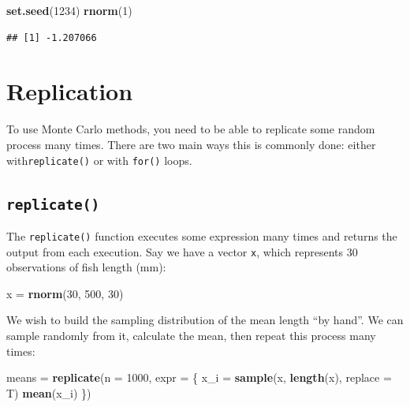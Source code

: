 \documentclass[]{book}
\newenvironment{Shaded}{\begin{snugshade}}{\end{snugshade}}
\newcommand{\KeywordTok}[1]{\textcolor[rgb]{0.13,0.29,0.53}{\textbf{#1}}}
\newcommand{\DataTypeTok}[1]{\textcolor[rgb]{0.13,0.29,0.53}{#1}}
\newcommand{\DecValTok}[1]{\textcolor[rgb]{0.00,0.00,0.81}{#1}}
\newcommand{\StringTok}[1]{\textcolor[rgb]{0.31,0.60,0.02}{#1}}
\newcommand{\NormalTok}[1]{#1}
\theoremstyle{definition}
\theoremstyle{definition}
\theoremstyle{definition}
\theoremstyle{remark}
\begin{document}
\begin{Shaded}
\begin{Highlighting}[]
\KeywordTok{set.seed}\NormalTok{(}\DecValTok{1234}\NormalTok{)}
\KeywordTok{rnorm}\NormalTok{(}\DecValTok{1}\NormalTok{)}
\end{Highlighting}
\end{Shaded}

\begin{verbatim}
## [1] -1.207066
\end{verbatim}

\section{Replication}\label{replication}

To use Monte Carlo methods, you need to be able to replicate some random
process many times. There are two main ways this is commonly done:
either with\texttt{replicate()} or with \texttt{for()} loops.

\subsection{\texorpdfstring{\texttt{replicate()}}{replicate()}}\label{replicate}

The \texttt{replicate()} function executes some expression many times
and returns the output from each execution. Say we have a vector
\texttt{x}, which represents 30 observations of fish length (mm):

\begin{Shaded}
\begin{Highlighting}[]
\NormalTok{x =}\StringTok{ }\KeywordTok{rnorm}\NormalTok{(}\DecValTok{30}\NormalTok{, }\DecValTok{500}\NormalTok{, }\DecValTok{30}\NormalTok{)}
\end{Highlighting}
\end{Shaded}

We wish to build the sampling distribution of the mean length ``by
hand''. We can sample randomly from it, calculate the mean, then repeat
this process many times:

\begin{Shaded}
\begin{Highlighting}[]
\NormalTok{means =}\StringTok{ }\KeywordTok{replicate}\NormalTok{(}\DataTypeTok{n =} \DecValTok{1000}\NormalTok{, }\DataTypeTok{expr =}\NormalTok{ \{}
\NormalTok{  x_i =}\StringTok{ }\KeywordTok{sample}\NormalTok{(x, }\KeywordTok{length}\NormalTok{(x), }\DataTypeTok{replace =}\NormalTok{ T)}
  \KeywordTok{mean}\NormalTok{(x_i)}
\NormalTok{\})}
\end{Highlighting}
\end{Shaded}
\end{document}
